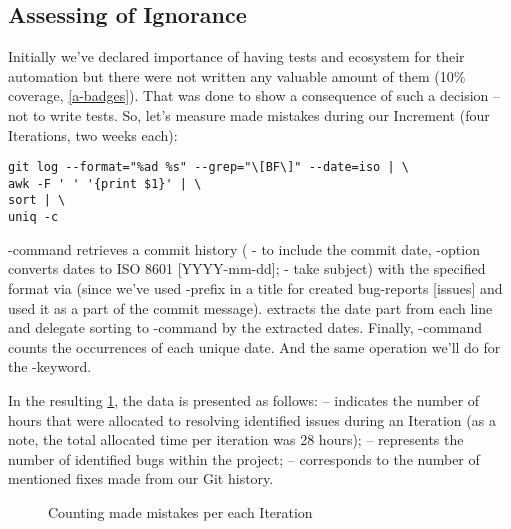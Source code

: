 \subsection{Assessing of Ignorance} \label{ut-fail}

Initially we've declared importance of having tests and ecosystem for their automation but there were not written any 
valuable amount of them (10\% coverage, \ref{a-badges}). That was done to show a consequence of such a decision -- not 
to write tests. So, let's measure made mistakes during our Increment (four Iterations, two weeks each):

\begin{lstlisting}[language=terminal]
git log --format="%ad %s" --grep="\[BF\]" --date=iso | \
awk -F ' ' '{print $1}' | \
sort | \
uniq -c
\end{lstlisting}

\noindent {}-command retrieves a commit history ( - to include the commit date, -option 
converts dates to ISO 8601 [YYYY-mm-dd];  - take subject) with the specified format via  (since we've 
used \q{[BF]}-prefix in a title for created bug-reports [issues] and used it as a part of the commit message). \q{awk} 
extracts the date part from each line and delegate sorting to \q{sort}-command by the extracted dates. Finally, 
\q{uniq -c}-command counts the occurrences of each unique date. And the same operation we'll do for the \q{fix}-keyword.

In the resulting \cref{graph:errors}, the data is presented as follows:
 -- indicates the number of hours that were allocated to resolving identified issues during an Iteration (as a 
note, the total allocated time per iteration was 28 hours);
\q{Bug} -- represents the number of identified bugs within the project;
\q{Fixes} -- corresponds to the number of mentioned fixes made from our Git history.

\begin{figure}[h]
  \begin{center}
  \end{center}
  \caption{Counting made mistakes per each Iteration}\label{graph:errors}
\end{figure}

